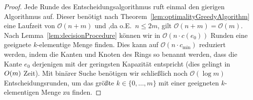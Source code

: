 \begin{proof}
    Jede Runde des Entscheidungsalgorithmus ruft einmal den gierigen Algorithmus auf.
    Dieser benötigt nach Theorem~\ref{lem:optimalityGreedyAlgorithm} eine Laufzeit von $\mathcal O(n+m)$ und ,da o.E.\
    $n \leq 2m$, gilt $\mathcal O(n+m) = \mathcal O(m)$.
    Nach Lemma~\ref{lem:decisionProcedure} können wir in $\mathcal O(n \cdot c(e_0))$ Runden eine geeignete $k$-elementige Menge finden.
    Dies kann auf $\mathcal O(n \cdot c_{\min})$ reduziert werden, indem die Kanten und Knoten des Rings so benannt werden, dass
    die Kante $e_0$ derjenigen mit der geringsten Kapazität entspricht (dies gelingt in $\mathcal \mathcal O(m)$ Zeit).
    Mit binärer Suche benötigen wir schließlich noch $\mathcal O(\log m)$ Entscheidungsrunden, um das größte $k \in \{0, \dots, m\}$
    mit einer geeigneten $k$-elementigen Menge zu finden.
\end{proof}













